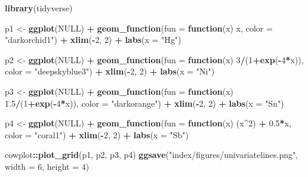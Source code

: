 \documentclass[12pt, twoside]{amherstthesis}
\newenvironment{Shaded}{\begin{snugshade}}{\end{snugshade}}
\newcommand{\AttributeTok}[1]{\textcolor[rgb]{0.13,0.29,0.53}{#1}}
\newcommand{\ConstantTok}[1]{\textcolor[rgb]{0.56,0.35,0.01}{#1}}
\newcommand{\ControlFlowTok}[1]{\textcolor[rgb]{0.13,0.29,0.53}{\textbf{#1}}}
\newcommand{\DecValTok}[1]{\textcolor[rgb]{0.00,0.00,0.81}{#1}}
\newcommand{\FloatTok}[1]{\textcolor[rgb]{0.00,0.00,0.81}{#1}}
\newcommand{\FunctionTok}[1]{\textcolor[rgb]{0.13,0.29,0.53}{\textbf{#1}}}
\newcommand{\NormalTok}[1]{#1}
\newcommand{\OtherTok}[1]{\textcolor[rgb]{0.56,0.35,0.01}{#1}}
\newcommand{\SpecialCharTok}[1]{\textcolor[rgb]{0.81,0.36,0.00}{\textbf{#1}}}
\newcommand{\StringTok}[1]{\textcolor[rgb]{0.31,0.60,0.02}{#1}}
\begin{document}
\scriptsize
\begin{Shaded}
\begin{Highlighting}[]
\FunctionTok{library}\NormalTok{(tidyverse)}

\NormalTok{p1 }\OtherTok{\textless{}{-}} \FunctionTok{ggplot}\NormalTok{(}\ConstantTok{NULL}\NormalTok{) }\SpecialCharTok{+}
  \FunctionTok{geom\_function}\NormalTok{(}\AttributeTok{fun =} \ControlFlowTok{function}\NormalTok{(x) x, }
                \AttributeTok{color =} \StringTok{"darkorchid1"}\NormalTok{) }\SpecialCharTok{+}
  \FunctionTok{xlim}\NormalTok{(}\SpecialCharTok{{-}}\DecValTok{2}\NormalTok{, }\DecValTok{2}\NormalTok{) }\SpecialCharTok{+}
  \FunctionTok{labs}\NormalTok{(}\AttributeTok{x =} \StringTok{"Hg"}\NormalTok{)}

\NormalTok{p2 }\OtherTok{\textless{}{-}} \FunctionTok{ggplot}\NormalTok{(}\ConstantTok{NULL}\NormalTok{) }\SpecialCharTok{+}
  \FunctionTok{geom\_function}\NormalTok{(}\AttributeTok{fun =} \ControlFlowTok{function}\NormalTok{(x) }\DecValTok{3}\SpecialCharTok{/}\NormalTok{(}\DecValTok{1}\SpecialCharTok{+}\FunctionTok{exp}\NormalTok{(}\SpecialCharTok{{-}}\DecValTok{4}\SpecialCharTok{*}\NormalTok{x)), }
                \AttributeTok{color =} \StringTok{"deepskyblue3"}\NormalTok{) }\SpecialCharTok{+}
  \FunctionTok{xlim}\NormalTok{(}\SpecialCharTok{{-}}\DecValTok{2}\NormalTok{, }\DecValTok{2}\NormalTok{) }\SpecialCharTok{+}
  \FunctionTok{labs}\NormalTok{(}\AttributeTok{x =} \StringTok{"Ni"}\NormalTok{)}

\NormalTok{p3 }\OtherTok{\textless{}{-}} \FunctionTok{ggplot}\NormalTok{(}\ConstantTok{NULL}\NormalTok{) }\SpecialCharTok{+}
  \FunctionTok{geom\_function}\NormalTok{(}\AttributeTok{fun =} \ControlFlowTok{function}\NormalTok{(x) }\FloatTok{1.5}\SpecialCharTok{/}\NormalTok{(}\DecValTok{1}\SpecialCharTok{+}\FunctionTok{exp}\NormalTok{(}\SpecialCharTok{{-}}\DecValTok{4}\SpecialCharTok{*}\NormalTok{x)), }
                \AttributeTok{color =} \StringTok{"darkorange"}\NormalTok{) }\SpecialCharTok{+}
  \FunctionTok{xlim}\NormalTok{(}\SpecialCharTok{{-}}\DecValTok{2}\NormalTok{, }\DecValTok{2}\NormalTok{) }\SpecialCharTok{+}
  \FunctionTok{labs}\NormalTok{(}\AttributeTok{x =} \StringTok{"Sn"}\NormalTok{)}

\NormalTok{p4 }\OtherTok{\textless{}{-}} \FunctionTok{ggplot}\NormalTok{(}\ConstantTok{NULL}\NormalTok{) }\SpecialCharTok{+}
  \FunctionTok{geom\_function}\NormalTok{(}\AttributeTok{fun =} \ControlFlowTok{function}\NormalTok{(x) (x}\SpecialCharTok{\^{}}\DecValTok{2}\NormalTok{) }\SpecialCharTok{+} \FloatTok{0.5}\SpecialCharTok{*}\NormalTok{x, }
                \AttributeTok{color =} \StringTok{"coral1"}\NormalTok{) }\SpecialCharTok{+}
  \FunctionTok{xlim}\NormalTok{(}\SpecialCharTok{{-}}\DecValTok{2}\NormalTok{, }\DecValTok{2}\NormalTok{) }\SpecialCharTok{+}
  \FunctionTok{labs}\NormalTok{(}\AttributeTok{x =} \StringTok{"Sb"}\NormalTok{)}

\NormalTok{cowplot}\SpecialCharTok{::}\FunctionTok{plot\_grid}\NormalTok{(p1, p2, p3, p4)}
\FunctionTok{ggsave}\NormalTok{(}\StringTok{"index/figures/univariatelines.png"}\NormalTok{, }\AttributeTok{width =} \DecValTok{6}\NormalTok{, }\AttributeTok{height =} \DecValTok{4}\NormalTok{)}
\end{Highlighting}
\end{Shaded}
\end{document}

